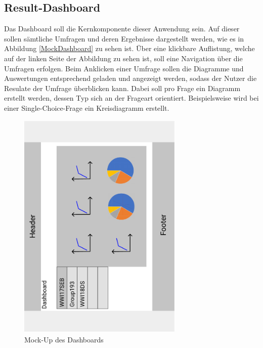 \subsection{Result-Dashboard}
\label{ssec:konzept:client:dashboard}

Das Dashboard soll die Kernkomponente dieser Anwendung sein. 
Auf dieser sollen sämtliche Umfragen und deren Ergebnisse dargestellt werden, wie es in Abbildung \ref{MockDashboard} zu sehen ist.
Über eine klickbare Auflistung, welche auf der linken Seite der Abbildung zu sehen ist, soll eine Navigation über die Umfragen erfolgen.
Beim Anklicken einer Umfrage sollen die Diagramme und Auswertungen entsprechend geladen und angezeigt werden, sodass der Nutzer die Resulate der Umfrage überblicken kann.
Dabei soll pro Frage ein Diagramm erstellt werden, dessen Typ sich an der Frageart orientiert.
Beispielsweise wird bei einer Single-Choice-Frage ein Kreisdiagramm erstellt.

\begin{figure}[h]
	\centering
	\includegraphics[width=0.7\textwidth]{img/konzeption/client/dashboard}
	\captionsetup{justification=centering, format=plain}
	\caption[Mock-Up des Dashboards]{Mock-Up des Dashboards \\\figma}
	\label{fig:MockDashboard}
\end{figure}

